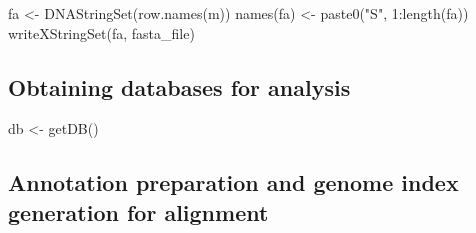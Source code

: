 \documentclass[12pt,twoside]{reedthesis}
\newenvironment{Shaded}{\begin{snugshade}}{\end{snugshade}}
\newcommand{\AttributeTok}[1]{\textcolor[rgb]{0.77,0.63,0.00}{#1}}
\newcommand{\ConstantTok}[1]{\textcolor[rgb]{0.00,0.00,0.00}{#1}}
\newcommand{\DecValTok}[1]{\textcolor[rgb]{0.00,0.00,0.81}{#1}}
\newcommand{\FunctionTok}[1]{\textcolor[rgb]{0.00,0.00,0.00}{#1}}
\newcommand{\NormalTok}[1]{#1}
\newcommand{\OtherTok}[1]{\textcolor[rgb]{0.56,0.35,0.01}{#1}}
\newcommand{\SpecialCharTok}[1]{\textcolor[rgb]{0.00,0.00,0.00}{#1}}
\newcommand{\StringTok}[1]{\textcolor[rgb]{0.31,0.60,0.02}{#1}}
\begin{document}
\begin{Shaded}
\begin{Highlighting}[]
\NormalTok{fa }\OtherTok{\textless{}{-}} \FunctionTok{DNAStringSet}\NormalTok{(}\FunctionTok{row.names}\NormalTok{(m))}
\FunctionTok{names}\NormalTok{(fa) }\OtherTok{\textless{}{-}} \FunctionTok{paste0}\NormalTok{(}\StringTok{"S"}\NormalTok{, }\DecValTok{1}\SpecialCharTok{:}\FunctionTok{length}\NormalTok{(fa))}
\FunctionTok{writeXStringSet}\NormalTok{(fa, fasta\_file)}
\end{Highlighting}
\end{Shaded}
\hypertarget{obtaining-databases-for-analysis}{%
\subsection*{Obtaining databases for analysis}\label{obtaining-databases-for-analysis}}
\begin{Shaded}
\begin{Highlighting}[]
\NormalTok{db }\OtherTok{\textless{}{-}} \FunctionTok{getDB}\NormalTok{()}
\end{Highlighting}
\end{Shaded}
\hypertarget{annotation-preparation-and-genome-index-generation-for-alignment}{%
\subsection*{Annotation preparation and genome index generation for alignment}\label{annotation-preparation-and-genome-index-generation-for-alignment}}
\begin{Shaded}
\end{Shaded}
\end{document}
